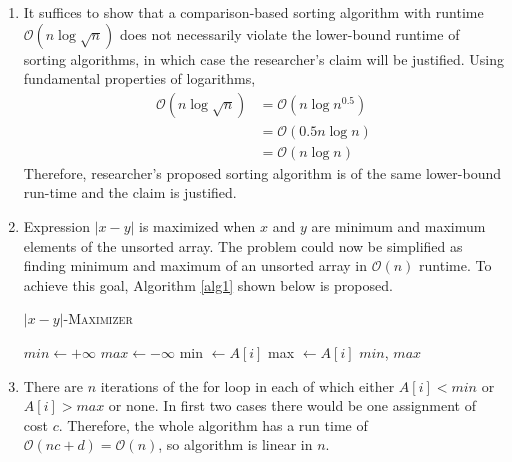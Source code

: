 \begin{enumerate}[label=(\alph*)]
\item It suffices to show that a comparison-based sorting algorithm with runtime $\mathcal{O}(n\log \sqrt{n})$ does not necessarily violate the lower-bound runtime of sorting algorithms, in which case the researcher's claim will be justified. Using fundamental properties of logarithms,
\begin{equation}\label{eq31}
\begin{aligned}
\mathcal{O}(n\log \sqrt{n}) &= \mathcal{O}(n\log n^{0.5})\\
&= \mathcal{O}(0.5 n \log n)\\
&= \mathcal{O}(n\log n)
\end{aligned}
\end{equation}
Therefore, researcher's proposed sorting algorithm is of the same lower-bound run-time and the claim is justified.
\item Expression $|x-y|$ is maximized when $x$ and $y$ are minimum and maximum elements of the unsorted array. The problem could now be simplified as finding minimum and maximum of an unsorted array in $\mathcal{O}(n)$ runtime. To achieve this goal, Algorithm \ref{alg1} shown below is proposed.
\begin{algorithm}[H]
\caption{\textsc{$|x-y|$-Maximizer}}\label{alg1}
\begin{algorithmic}[1]
\State $min \leftarrow +\infty$
\State $max \leftarrow -\infty$
\State min $\leftarrow A[i]$
\State max $\leftarrow A[i]$
\EndIf
\EndFor
\State \Return $min$, $max$
\end{algorithmic}
\end{algorithm}
\item There are $n$ iterations of the for loop in each of which either $A[i] < min$ or $A[i] > max$ or none. In first two cases there would be one assignment of cost $c$. Therefore, the whole algorithm has a run time of $\mathcal{O}(nc+d)=\mathcal{O}(n)$, so algorithm is linear in $n$.
\end{enumerate}
